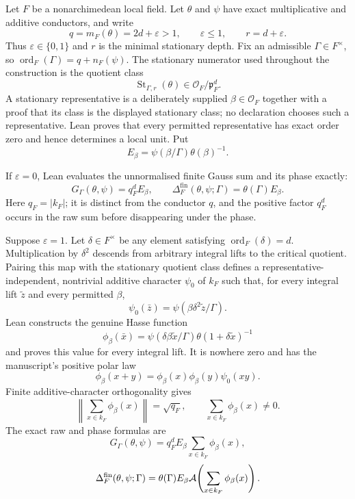 \begin{definition}\label{mod:lamprecht-formula}
Let $F$ be a nonarchimedean local field.  Let $\theta$ and $\psi$ have
exact multiplicative and additive conductors, and write
\[
 q=m_F(\theta)=2d+\varepsilon>1,
 \qquad \varepsilon\leq 1,
 \qquad r=d+\varepsilon.
\]
Thus $\varepsilon\in\{0,1\}$ and $r$ is the minimal stationary depth.
Fix an admissible $\Gamma\in F^\times$, so
$\operatorname{ord}_F(\Gamma)=q+n_F(\psi)$.  The stationary numerator used
throughout the construction is the quotient class
\[
 \operatorname{St}_{\Gamma,r}(\theta)
   \in \mathcal O_F/\mathfrak p_F^d.
\]
A stationary representative is a deliberately supplied
$\beta\in\mathcal O_F$ together with a proof that its class is the displayed
stationary class; no declaration chooses such a representative.  Lean proves
that every permitted representative has exact order zero and hence determines
a local unit.  Put
\[
 E_\beta=\psi(\beta/\Gamma)\theta(\beta)^{-1}.
\]

If $\varepsilon=0$, Lean evaluates the unnormalised finite Gauss sum and its
phase exactly:
\[
 G_\Gamma(\theta,\psi)=q_F^dE_\beta,
 \qquad
 \Delta_F^{\mathrm{fin}}(\theta,\psi;\Gamma)
   =\theta(\Gamma)E_\beta.
\]
Here $q_F=|k_F|$; it is distinct from the conductor $q$, and the positive
factor $q_F^d$ occurs in the raw sum before disappearing under the phase.

Suppose $\varepsilon=1$.  Let $\delta\in F^\times$ be any element satisfying
$\operatorname{ord}_F(\delta)=d$.  Multiplication by $\delta^2$ descends from
arbitrary integral lifts to the critical quotient.  Pairing this map with the
stationary quotient class defines a representative-independent, nontrivial
additive character $\psi_0$ of $k_F$ such that, for every integral lift
$\widetilde z$ and every permitted $\beta$,
\[
 \psi_0(\bar z)=
 \psi(\beta\delta^2\widetilde z/\Gamma).
\]
Lean constructs the genuine Hasse function
\[
 \phi_\beta(\bar x)=
 \psi(\delta\beta\widetilde x/\Gamma)
 \theta(1+\delta\widetilde x)^{-1}
\]
and proves this value for every integral lift.  It is nowhere zero and has the
manuscript's positive polar law
\[
 \phi_\beta(x+y)=
 \phi_\beta(x)\phi_\beta(y)\psi_0(xy).
\]
Finite additive-character orthogonality gives
\[
 \left\lVert\sum_{x\in k_F}\phi_\beta(x)\right\rVert=\sqrt{q_F},
 \qquad
 \sum_{x\in k_F}\phi_\beta(x)\ne0.
\]
The exact raw and phase formulas are
\[
 G_\Gamma(\theta,\psi)
   =q_F^dE_\beta\sum_{x\in k_F}\phi_\beta(x),
\]
\[
 \Delta_F^{\mathrm{fin}}(\theta,\psi;\Gamma)
   =\theta(\Gamma)E_\beta
      \mathcal A\!\left(\sum_{x\in k_F}\phi_\beta(x)\right).
\]


\end{definition}
